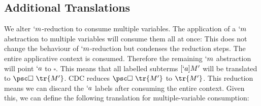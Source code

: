 \subsection{Additional Translations}
We alter $`m$-reduction to consume multiple variables.
The application of a $`m$ abstraction to multiple variables will consume them all at once:
This does not change the behaviour of $`m$-reduction but condenses the reduction steps.
The entire applicative context is consumed.
Therefore the remaining $`m$ abstraction will point $`a$ to $\square$.
This means that all labelled subterms $[`a]M'$ will be translated to $\psc \square\ \tr{M'}$.
CDC reduces $\psc \square\ \tr{M'}$ to $\tr{M'}$.
This reduction means we can discard the $`a$ labels after consuming the entire context.
Given this, we can define the following translation for multiple-variable consumption:

